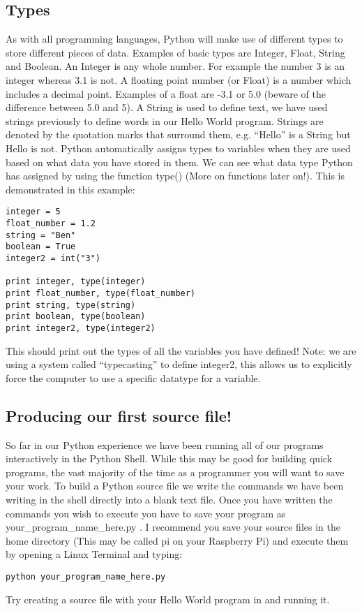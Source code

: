 \documentclass[twocolumn]{article}
\begin{document}
\subsection{Types}
As with all programming languages, Python will make use of different types to store different pieces of data. Examples of basic types are Integer, Float, String and Boolean. An Integer is any whole number. For example the number 3 is an integer whereas 3.1 is not. A floating point number (or Float) is a number which includes a decimal point. Examples of a float are -3.1 or 5.0 (beware of the difference between 5.0 and 5). A String is used to define text, we have used strings previously to define words in our Hello World program. Strings are denoted by the quotation marks that surround them, e.g. ``Hello'' is a String but Hello is not. Python automatically assigns types to variables when they are used based on what data you have stored in them. We can see what data type Python has assigned by using the function type() (More on functions later on!). This is demonstrated in this example:
\begin{lstlisting}
integer = 5
float_number = 1.2
string = "Ben"
boolean = True
integer2 = int("3")

print integer, type(integer)
print float_number, type(float_number)
print string, type(string)
print boolean, type(boolean)
print integer2, type(integer2)
\end{lstlisting}
This should print out the types of all the variables you have defined! Note: we are using a system called ``typecasting'' to define integer2, this allows us to explicitly force the computer to use a specific datatype for a variable.
\subsection{Producing our first source file!}
So far in our Python experience we have been running all of our programs interactively in the Python Shell. While this may be good for building quick programs, the vast majority of the time as a programmer you will want to save your work. To build a Python source file we write the commands we have been writing in the shell directly into a blank text file. Once you have written the commands you wish to execute you have to save your program as your\_program\_name\_here.py . I recommend you save your source files in the home directory (This may be called pi on your Raspberry Pi) and execute them by opening a Linux Terminal and typing:
\begin{lstlisting}
python your_program_name_here.py
\end{lstlisting}
Try creating a source file with your Hello World program in and running it.
\end{document}
